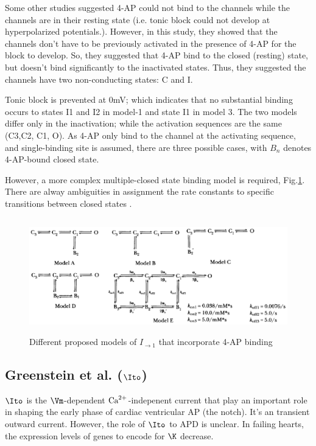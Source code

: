 Some other studies suggested 4-AP could not bind to the channels while the
channels are in their resting state (i.e. tonic block could not develop at
hyperpolarized potentials.). However, in this study, they showed that the
channels don't have to be previously activated in the presence of 4-AP for the
block to develop. So, they suggested that 4-AP bind to the closed
(resting) state, but doesn't bind significantly to the inactivated states. Thus,
they suggested the channels have two non-conducting states: C and I. 

Tonic block is prevented at 0mV; which indicates that no substantial binding
occurs to states I1 and I2 in model-1 and state I1 in model 3. The two models
differ only in the inactivation; while the activation sequences are the same
(C3,C2, C1, O). As 4-AP only bind to the channel at the activating sequence, and
single-binding site is assumed, there are three possible cases, with $B_n$
denotes 4-AP-bound closed state.

However, a more complex multiple-closed state binding model is required,
Fig.\ref{fig:Ito1_4-AP_campbell93_model}. There are alway ambiguities in
assignment the rate constants to specific transitions between closed states \citep{hille1992mb}.


\begin{figure}[hbt]
 \centerline{\includegraphics[height=5cm, angle=0]{./images/Ito1_4-AP_campbell93_model.eps}}
\caption{Different proposed models of $I_{\to1}$ that incorporate 4-AP binding
\citep{Campbell1993}}
\label{fig:Ito1_4-AP_campbell93_model}
\end{figure}


\subsection{Greenstein et al. ($\Ito$)}
\label{sec:Greenstein_Ito1}

$\Ito$ is the $\Vm$-dependent ${\text{Ca}^{2+}}$-indepenent current that play an important
role in shaping the early phase of cardiac ventricular AP (the notch). It's an
transient outward current. However, the role of $\Ito$ to APD is unclear. In
failing hearts, the expression levels of genes to encode for $\K$ decrease. 

